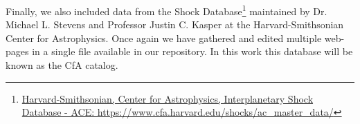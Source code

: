 Finally, we also included data from the Shock Database\footnote{\href{https://www.cfa.harvard.edu/shocks/ac_master_data/}{Harvard-Smithsonian, Center for Astrophysics, Interplanetary Shock Database - ACE: https://www.cfa.harvard.edu/shocks/ac\_master\_data/}} maintained by Dr. Michael L. Stevens and Professor Justin C. Kasper at the Harvard-Smithsonian Center for Astrophysics. Once again we have gathered and edited multiple web-pages in a single file available in our repository. In this work this database will be known as the CfA catalog.